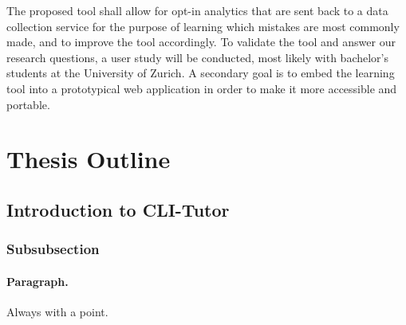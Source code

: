 The proposed tool shall allow for opt-in analytics that are sent back to a data
collection service for the purpose of learning which mistakes are most commonly
made, and to improve the tool accordingly. To validate the tool and answer our
research questions, a user study will be conducted, most likely with bachelor's
students at the University of Zurich. A secondary goal is to embed the learning
tool into a prototypical web application in order to make it more accessible
and portable. \section{Thesis Outline}






\subsection{Introduction to CLI-Tutor}
\subsubsection{Subsubsection}
\paragraph{Paragraph.} Always with a point.
{}
